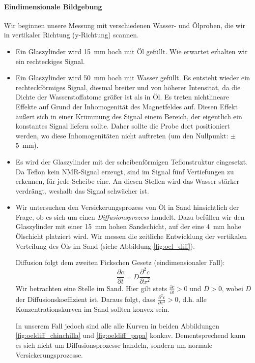 \documentclass[a4paper]{scrartcl} %
\begin{document}
\paragraph{Eindimensionale Bildgebung}

Wir beginnen unsere Messung mit verschiedenen Wasser- und Ölproben, die wir in vertikaler Richtung (y-Richtung) scannen.

\begin{itemize}
	\item Ein Glaszylinder wird \SI{15}{mm} hoch mit Öl gefüllt. Wie erwartet erhalten wir ein rechteckiges Signal.
	\item Ein Glaszylinder wird \SI{50}{mm} hoch mit Wasser gefüllt. Es entsteht wieder ein rechteckförmiges Signal, diesmal breiter und von höherer Intensität, da die Dichte der Wasserstoffatome größer ist als in Öl. Es treten nichtlineare Effekte auf Grund der Inhomogenität des Magnetfeldes auf. Diesen Effekt äußert sich in einer Krümmung des Signal einem Bereich, der eigentlich ein konstantes Signal liefern sollte. Daher sollte die Probe dort positioniert werden, wo diese Inhomogenitäten nicht auftreten (um den Nullpunkt: $\pm$ \SI{5}{mm}).
	\item Es wird der Glaszylinder mit der scheibenförmigen Teflonstruktur eingesetzt. Da Teflon kein NMR-Signal erzeugt, sind im Signal fünf Vertiefungen zu erkennen, für jede Scheibe eine. An diesen Stellen wird das Wasser stärker verdrängt, weshalb das Signal schwächer ist.
	\item Wir untersuchen den Versickerungsprozess von Öl in Sand hinsichtlich der Frage, ob es sich um einen \emph{Diffusionsprozess} handelt. Dazu befüllen wir den Glaszylinder mit einer \SI{15}{mm} hohen Sandschicht, auf der eine \SI{4}{mm} hohe Ölschicht platziert wird. Wir messen die zeitliche Entwicklung der vertikalen Verteilung des Öls im Sand (siehe Abbildung \ref{fig:oel_diff}).

	Diffusion folgt dem zweiten Fickschen Gesetz (eindimensionaler Fall):
	\begin{equation}
		\frac{\partial c}{\partial t} = D \frac{\partial^2 c}{\partial x^2}
	\end{equation}
	Wir betrachten eine Stelle im Sand. Hier gilt stets $\tfrac{\partial c}{\partial t} > 0$ und $D > 0$, wobei $D$ der Diffusionskoeffizient ist. Daraus folgt, dass $\tfrac{\partial^2 c}{\partial x^2} > 0$, d.h. alle Konzentrationskurven im Sand sollten konvex sein.

	In unserem Fall jedoch sind alle alle Kurven in beiden Abbildungen \ref{fig:oeldiff_chinchilla} und \ref{fig:oeldiff_papa} konkav. Dementsprechend kann es sich nicht um Diffusionsprozesse handeln, sondern um normale Versickerungsprozesse.
\end{itemize}
\end{document}
